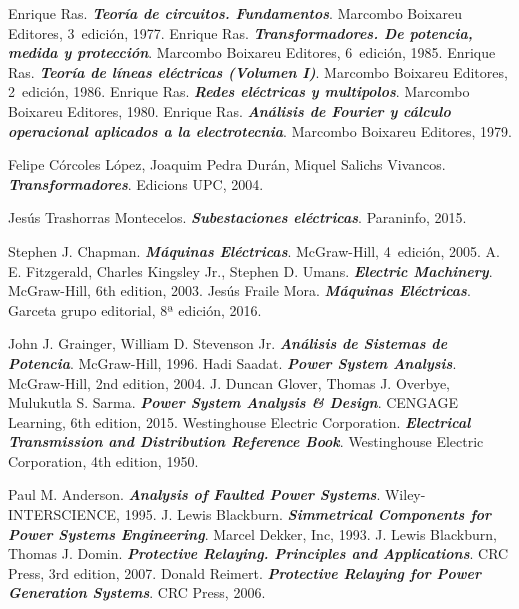 \begin{thebibliography}{99}
     Enrique Ras. \textbf{\textit{Teoría de circuitos. Fundamentos}}.  Marcombo Boixareu Editores, 3\textordfeminine\ edición, 1977.
     Enrique Ras. \textbf{\textit{Transformadores. De potencia, medida y protección}}.  Marcombo Boixareu Editores, 6\textordfeminine\ edición, 1985.
     Enrique Ras. \textbf{\textit{Teoría de líneas eléctricas (Volumen I)}}.  Marcombo Boixareu Editores, 2\textordfeminine\ edición, 1986.
     Enrique Ras. \textbf{\textit{Redes eléctricas y multipolos}}.  Marcombo Boixareu Editores, 1980.
     Enrique Ras. \textbf{\textit{Análisis de Fourier y cálculo operacional aplicados a la electrotecnia}}.  Marcombo Boixareu Editores, 1979.

     Felipe Córcoles López, Joaquim Pedra Durán, Miquel Salichs Vivancos. \textbf{\textit{Transformadores}}.  Edicions UPC, 2004.

     Jesús Trashorras Montecelos. \textbf{\textit{Subestaciones eléctricas}}.  Paraninfo, 2015.


     Stephen J. Chapman. \textbf{\textit{Máquinas Eléctricas}}.  McGraw-Hill, 4\textordfeminine\ edición, 2005.
     A. E. Fitzgerald, Charles Kingsley Jr., Stephen D. Umans. \textbf{\textit{Electric Machinery}}.  McGraw-Hill, 6th edition, 2003.
     Jesús Fraile Mora. \textbf{\textit{Máquinas Eléctricas}}.  Garceta grupo editorial, 8ª edición, 2016.

     John J. Grainger, William D. Stevenson Jr. \textbf{\textit{Análisis de Sistemas de Potencia}}.  McGraw-Hill, 1996.
     Hadi Saadat. \textbf{\textit{Power System Analysis}}.  McGraw-Hill, 2nd edition, 2004.
     J. Duncan Glover, Thomas J. Overbye, Mulukutla S. Sarma. \textbf{\textit{Power System Analysis \& Design}}.  CENGAGE Learning, 6th edition, 2015.
     Westinghouse Electric Corporation. \textbf{\textit{Electrical Transmission and Distribution Reference Book}}.  Westinghouse Electric Corporation, 4th edition, 1950.

     Paul M. Anderson. \textbf{\textit{Analysis of Faulted Power Systems}}.  Wiley-INTERSCIENCE, 1995.
     J. Lewis Blackburn. \textbf{\textit{Simmetrical Components for Power Systems Engineering}}.  Marcel Dekker, Inc, 1993.
     J. Lewis Blackburn, Thomas J. Domin. \textbf{\textit{Protective Relaying. Principles and Applications}}.  CRC Press, 3rd edition, 2007.
     Donald Reimert. \textbf{\textit{Protective Relaying for Power Generation Systems}}.  CRC Press, 2006.



\end{thebibliography}

